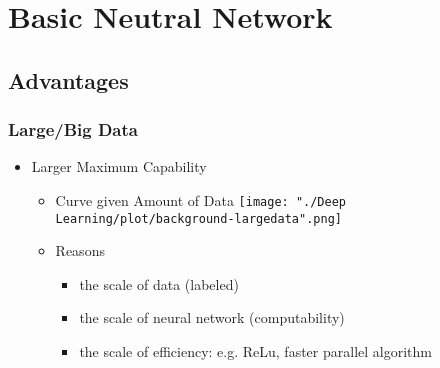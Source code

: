 \section{Basic Neutral Network}

\subsection{Advantages}
\subsubsection{Large/Big Data}
\begin{itemize}
\item Larger Maximum Capability
	\begin{itemize}
	\item Curve given Amount of Data
	\texttt{[image: "./Deep Learning/plot/background-largedata".png]}
	\item Reasons
		\begin{itemize}
		\item the scale of data (labeled)
		\item the scale of neural network (computability)
		\item the scale of efficiency: e.g. ReLu, faster parallel algorithm
		\end{itemize}
	\end{itemize}
\end{itemize}

